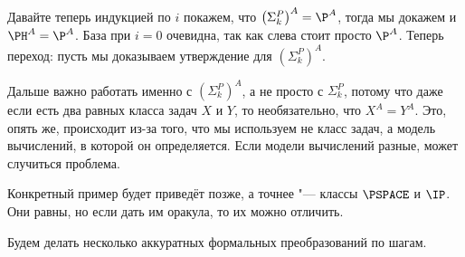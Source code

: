 	Давайте теперь индукцией по $i$ покажем, что $\left(\Sigma_k^P\right)^A = \P^A$, тогда мы докажем и $\PH^A=\P^A$.
	База при $i=0$ очевидна, так как слева стоит просто $\P^A$.
	Теперь переход: пусть мы доказываем утверждение для $\left(\Sigma_k^P\right)^A$.
	\begin{Rem}
		Дальше важно работать именно с $\left(\Sigma_k^P\right)^A$, а не просто с $\Sigma_k^P$, потому что
		даже если есть два равных класса задач $X$ и $Y$, то необязательно, что $X^A=Y^A$.
		Это, опять же, происходит из-за того, что мы используем не класс задач, а модель вычислений, в которой он определяется.
		Если модели вычислений разные, может случиться проблема.
		
		Конкретный пример будет приведёт позже, а точнее "--- классы $\PSPACE$ и $\IP$.
		Они равны, но если дать им оракула, то их можно отличить.
	\end{Rem}
	Будем делать несколько аккуратных формальных преобразований по шагам.
